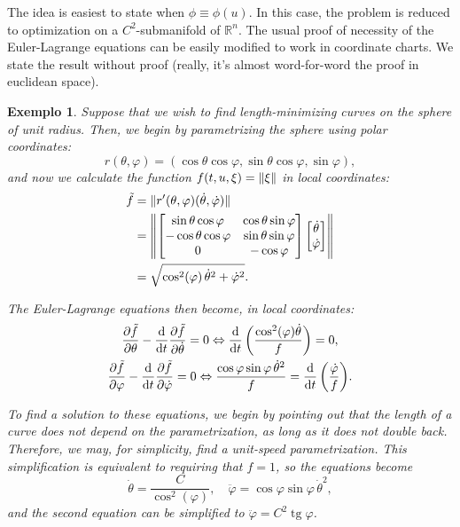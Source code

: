 \documentclass{article}
\theoremstyle{plain}
\theoremstyle{plain}
\newtheorem{example}{Exemplo}
\theoremstyle{nonumberplain}
\theoremstyle{empty}
\newcommand{\R}{\mathbb{R}}
\DeclarePairedDelimiter\norm{\lVert}{\rVert}
\DeclareMathOperator{\tg}{tg}
\begin{document}
The idea is easiest to state when $\phi \equiv \phi(u)$. In this case, the problem is reduced to optimization on a $C^2$-submanifold of $\R^n$. The usual proof of necessity of the Euler-Lagrange equations can be easily modified to work in coordinate charts. We state the result without proof (really, it's almost word-for-word the proof in euclidean space).


\begin{example}\label{sphere1}
Suppose that we wish to find length-minimizing curves on the sphere of unit radius. Then, we begin by parametrizing the sphere using polar coordinates:
\[r(\theta, \varphi) = (\cos\theta \cos\varphi, \sin\theta \cos\varphi, \sin\varphi),\]
and now we calculate the function $f(t,u,\xi) = \norm\xi$ in local coordinates:
\begin{align*}
\tilde f &= \norm{r'(\theta, \varphi) (\dot \theta, \dot \varphi)}\\
&= \norm*{\begin{bmatrix}
\sin\theta \cos\varphi & \cos\theta \sin\varphi\\
-\cos\theta \cos\varphi & \sin\theta \sin\varphi\\
0 & -\cos\varphi
\end{bmatrix}
\begin{bmatrix}
\dot\theta\\
\dot\varphi
\end{bmatrix}
}\\
&= \sqrt{\cos^2(\varphi) \, \dot\theta^2 + \dot\varphi^2}.
\end{align*}

The Euler-Lagrange equations then become, in local coordinates:
\begin{gather*}
\diffp{\tilde f} \theta - \diff*{\diffp{\tilde f}{\dot \theta}}t = 0 \Leftrightarrow \diff*{\left( \frac{\cos^2(\varphi) \dot \theta}{f} \right)}t = 0,\\
\diffp{\tilde f} \varphi - \diff*{\diffp{\tilde f}{\dot \varphi}}t = 0
\Leftrightarrow
\frac{\cos\varphi \sin\varphi \,\dot \theta^2}{f} = \diff*{\left( \frac{\dot \varphi}{f} \right)}t.
\end{gather*}

To find a solution to these equations, we begin by pointing out that the length of a curve does not depend on the parametrization, as long as it does not double back. Therefore, we may, for simplicity, find a unit-speed parametrization. This simplification is equivalent to requiring that $f = 1$, so the equations become
\[\dot \theta = \frac C {\cos^2(\varphi)}, \quad \ddot \varphi = \cos\varphi \sin\varphi \, \dot \theta^2,\]
and the second equation can be simplified to $\ddot \varphi = C^2 \tg \varphi$.


\end{example}
\end{document}
